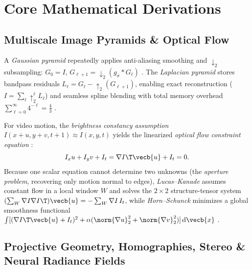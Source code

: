 \documentclass[../../../../master.tex]{subfiles}
\begin{document}
\section{Core Mathematical Derivations}

\subsection{Multiscale Image Pyramids \& Optical Flow}

\begin{coremath}
A \emph{Gaussian pyramid} repeatedly applies anti-aliasing smoothing and $\downarrow_2$ subsampling: $G_0 = I$, $G_{\ell+1} = \downarrow_2(g_\sigma * G_\ell)$ . The \emph{Laplacian pyramid} stores bandpass residuals $L_\ell = G_\ell - \uparrow_2(G_{\ell+1})$, enabling exact reconstruction ($I = \sum_\ell \uparrow_2^\ell L_\ell$) and seamless spline blending with total memory overhead $\sum_{\ell=0}^\infty 4^{-\ell} = \frac{4}{3}$ .

For video motion, the \emph{brightness constancy assumption} $I(x+u, y+v, t+1) \approx I(x,y,t)$ yields the linearized \emph{optical flow constraint equation} :
\begin{equation}
  I_x u + I_y v + I_t = \nabla I\T \vecb{u} + I_t = 0.
\end{equation}
Because one scalar equation cannot determine two unknowns (the \emph{aperture problem}, recovering only motion normal to edges), \emph{Lucas--Kanade} assumes constant flow in a local window $W$ and solves the $2\times 2$ structure-tensor system $(\sum_W \nabla I \nabla I\T)\vecb{u} = -\sum_W \nabla I\, I_t$, while \emph{Horn--Schunck} minimizes a global smoothness functional $\int [(\nabla I\T\vecb{u}+I_t)^2 + \alpha(\norm{\nabla u}_2^2 + \norm{\nabla v}_2^2)]\,\mathrm{d}\vecb{x}$ .
\end{coremath}

\subsection{Projective Geometry, Homographies, Stereo \& Neural Radiance Fields}
\end{document}
